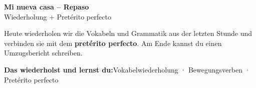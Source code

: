 \documentclass[11pt, a4paper]{article}
\newcommand{\seriftext}[1]{{\fontfamily{ppl}\selectfont #1}}
\newcommand{\thema}{Mi nueva casa -- Repaso}
\newcommand{\untertitel}{Wiederholung + Pretérito perfecto}
\newcommand{\lernziele}{Vokabelwiederholung · Bewegungsverben · Pretérito perfecto}
\newcommand{\es}[1]{\seriftext{\textbf{#1}}}
\begin{document}
\begin{center}
    {\LARGE\bfseries \thema}\\[3pt]
    {\small \untertitel}
\end{center}

\vspace{4pt}

Heute wiederholen wir die Vokabeln und Grammatik aus der letzten Stunde und verbinden sie mit dem \es{pretérito perfecto}. Am Ende kannst du einen Umzugsbericht schreiben.

\vspace{2pt}

\begin{lernzielbox}
\textbf{Das wiederholst und lernst du:}\quad \lernziele
\end{lernzielbox}

\end{document}
